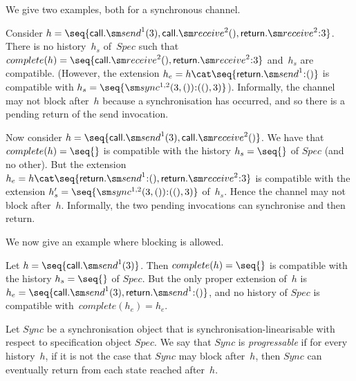 
We give two examples, both for a synchronous channel.
%
\begin{example}
Consider $h = \seq{ \call.\send^1(3), \call.\receive^2(),
  \return.\receive^2\::3 }$.  There is no history~$h_s$ of~$Spec$ such that
$complete(h) = \seq{\call.\receive^2(),\linebreak[1] \return.\receive^2\::3
}$ and~$h_s$ are compatible.  (However, the extension $h_e = h \cat \seq{
  \return.\send^1 \:: () }$ is compatible with $h_s =
\seq{\sync^{1,2}(3,())\::((),3) }$).  Informally, the channel may not block
after~$h$ because a synchronisation has occurred, and so there is a pending
return of the send invocation.
\end{example}

\begin{example}
Now consider $h = \seq{\call.\send^1(3), \call.\receive^2()}$.  We have that
$complete(h) = \seq{}$ is compatible with the history $h_s = \seq{}$ of $Spec$
(and no other). But the extension $h_e = h \cat
\seq{\return.\send^1\::(),\linebreak[1] \return.\receive^2\::3}$ is compatible
with the extension $h_s' = \linebreak[1] \seq{\sync^{1,2}(3,()) \:: ((),3)}$
of~$h_s$.  Hence the channel may not block after~$h$.  Informally, the two
pending invocations can synchronise and then return. 
\end{example}

We now give an example where blocking is allowed.
%
\begin{example}  
Let $h = \seq{\call.\send^1(3)}$.  Then $complete(h) = \seq{}$ is compatible
with the history $h_s = \seq{}$ of $Spec$.  But the only proper extension
of~$h$ is $h_e = \seq{\call.\send^1(3),\linebreak[1] \return.\send^1\::()}$,
and no history of $Spec$ is compatible with~$complete(h_e) = h_e$.
\end{example}



\begin{definition}
Let $Sync$ be a synchronisation object that is synchronisation-linearisable
with respect to specification object $Spec$.  We say that $Sync$ is
\emph{progressable} if for every history~$h$, if it is not the case that $Sync$
may block after~$h$, then $Sync$ can eventually return from each state reached
after~$h$.
\end{definition}

